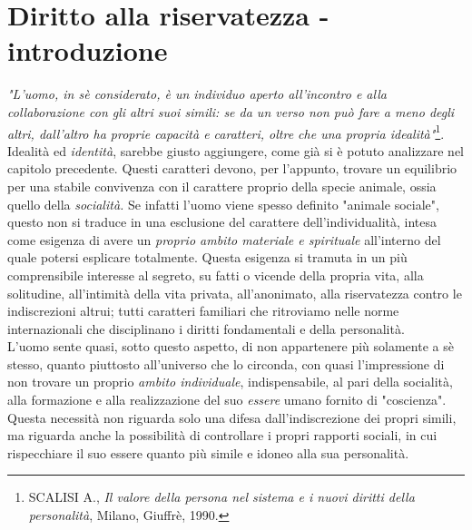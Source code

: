


\section{Diritto alla riservatezza - introduzione}
\textit{"L'uomo, in sè considerato, è un individuo aperto all'incontro e alla collaborazione con gli altri suoi simili: se da un verso non può fare a meno degli altri, dall'altro ha proprie capacità e caratteri, oltre che una propria idealità"}\footnote{SCALISI A., \textit{Il valore della persona nel sistema e i nuovi diritti della personalità}, Milano, Giuffrè, 1990.}.
\\Idealità ed \textit{identità}, sarebbe giusto aggiungere, come già si è potuto analizzare nel capitolo precedente.
Questi caratteri devono, per l'appunto, trovare un equilibrio per una stabile convivenza con il carattere proprio della specie animale, ossia quello della \textit{socialità.} Se infatti l'uomo viene spesso definito "animale sociale", questo non si traduce in una esclusione del carattere dell'individualità, intesa come esigenza di avere un \textit{proprio ambito materiale e spirituale} all'interno del quale potersi esplicare totalmente.
Questa esigenza si tramuta in un più comprensibile interesse al segreto, su fatti o vicende della propria vita, alla solitudine, all'intimità della vita privata, all'anonimato, alla riservatezza contro le indiscrezioni altrui; tutti caratteri familiari che ritroviamo nelle norme internazionali che disciplinano i diritti fondamentali e della personalità.
\\L'uomo sente quasi, sotto questo aspetto, di non appartenere più solamente a sè stesso, quanto piuttosto all'universo che lo circonda, con quasi l'impressione di non trovare un proprio \textit{ambito individuale}, indispensabile, al pari della socialità, alla formazione e alla realizzazione del suo \textit{essere} umano fornito di "coscienza".
Questa necessità non riguarda solo una difesa dall'indiscrezione dei propri simili, ma riguarda anche la possibilità di controllare i propri rapporti sociali, in cui rispecchiare il suo essere quanto più simile e idoneo alla sua personalità.

